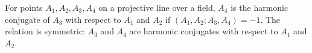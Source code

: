 For points $A_1, A_2, A_3, A_4$ on a projective line over a field, $A_4$ is the harmonic conjugate of $A_3$ with respect to $A_1$ and $A_2$ if $(A_1, A_2; A_3, A_4) = -1$. The relation is symmetric: $A_3$ and $A_4$ are harmonic conjugates with respect to $A_1$ and $A_2$.
